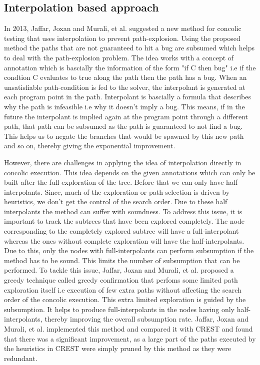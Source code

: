 \documentclass[	runningheads,
				a4paper]{llncs}
\begin{document}
\subsection{Interpolation based approach}
In 2013, Jaffar, Joxan and Murali, et al. suggested a new method \cite{jaffar2013boosting} for concolic testing that uses interpolation to prevent path-explosion. Using the proposed method the paths that are not guaranteed to hit a bug are subsumed which helps to deal with the path-explosion problem. The idea works with a concept of annotation which is bascially the  information of the form "if C then bug" i.e if the condtion C evaluates to true along the path then the path has a bug. When an unsatisfiable path-condition is fed to the solver, the interpolant is generated at each program point in the path. Interpolant is bascially a formula that describes why the path is infeasible i.e why it doesn't imply a bug. This means, if in the future the interpolant is implied again at the program point through a different path, that path can be subsumed as the path is guaranteed to not find a bug. This helps us to negate the branches that would be spawned by this new path and so on, thereby giving the exponential improvement.

However, there are challenges \cite{jaffar2013boosting} in applying the idea of interpolation directly in concolic execution. This idea depends on the given annotations which can only be built after the full exploration of the tree. Before that we can only have half interpolants. Since, much of the exploration or path selection is driven by heuristics, we don't get the control of the search order. Due to these half interpolants the method can suffer with soundness. To address this issue, it is important to track the subtrees that have been explored completely. The node corresponding to the completely explored subtree will have a full-interpolant whereas the ones without complete exploration will have the half-interpolants. Due to this, only the nodes with full-interpolants can perform subsumption if the method has to be sound. This limits the number of subsumption that can be performed. To tackle this issue, Jaffar, Joxan and Murali, et al. \cite{jaffar2013boosting} proposed a greedy technique called greedy confirmation that perfoms some limited path exploration itself i.e execution of few extra paths without affecting the search order of the concolic execution. This extra limited exploration is guided by the subsumption. It helps to produce full-interpolants in the nodes having only half-interpolants, thereby improving the overall subsumption rate. Jaffar, Joxan and Murali, et al. \cite{jaffar2013boosting} implemented this method and compared it with CREST
\cite{kousik2008heuristic} and found that there was a significant improvement, as a large part of the paths executed by the heuristics in CREST were simply pruned by this method as they were redundant.
\end{document}
